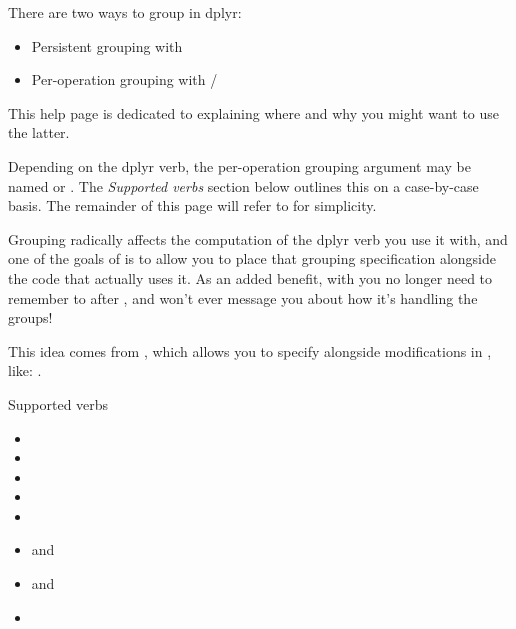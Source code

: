 \documentclass[a4paper]{book}
\begin{document}
\begin{Description}
There are two ways to group in dplyr:
\begin{itemize}

\item{} Persistent grouping with 
\item{} Per-operation grouping with /

\end{itemize}


This help page is dedicated to explaining where and why you might want to use the latter.

Depending on the dplyr verb, the per-operation grouping argument may be named  or .
The \emph{Supported verbs} section below outlines this on a case-by-case basis.
The remainder of this page will refer to  for simplicity.

Grouping radically affects the computation of the dplyr verb you use it with, and one of the goals of  is to allow you to place that grouping specification alongside the code that actually uses it.
As an added benefit, with  you no longer need to remember to  after , and  won't ever message you about how it's handling the groups!

This idea comes from , which allows you to specify  alongside modifications in , like: .
%
\begin{SubSection}{Supported verbs}
\begin{itemize}

\item{} 
\item{} 
\item{} 
\item{} 
\item{} 
\item{}  and 
\item{}  and 
\item{} 


\end{itemize}
\end{SubSection}
\end{Description}
\end{document}
